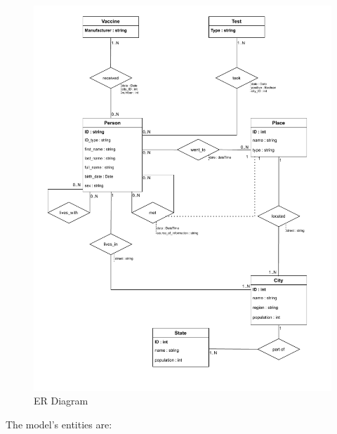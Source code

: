 \documentclass{article}[IEEEtran]
\begin{document}
\begin{figure}[H]
\begin{center}
    \includegraphics[width=\textwidth]{ER_Neo4J.pdf}
    \caption{ER Diagram}
\end{center}
\end{figure}

\newpage

The model's entities are:
\end{document}
